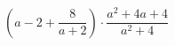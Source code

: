 \begin{ex}[type=expression]
	\begin{condition}
		\( \left( a-2+\dfrac{8}{a+2} \right) \cdot\dfrac{a^2+4a+4}{a^2+4}\)
	\end{condition}
\end{ex}